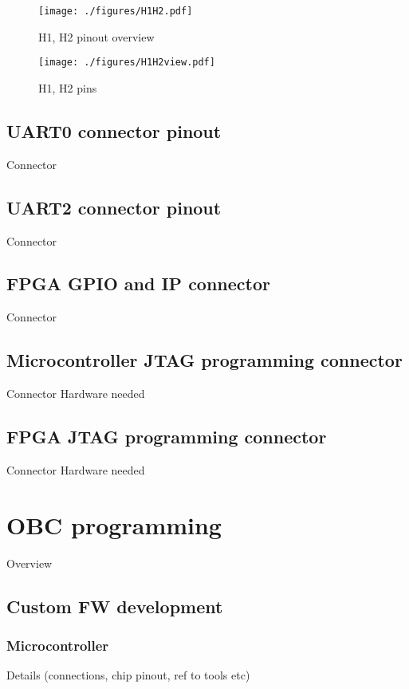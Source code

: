 \documentclass[12pt,a4paper]{report}
\begin{document}
\begin{figure}
\centering
\texttt{[image: ./figures/H1H2.pdf]}
\caption{H1, H2 pinout overview}
\label{fig_H1H2}
\end{figure}

\begin{figure}
\centering
\texttt{[image: ./figures/H1H2view.pdf]}
\caption{H1, H2 pins}
\label{fig_H1H2view}
\end{figure}


\section{UART0 connector pinout}
Connector

\section{UART2 connector pinout}
Connector

\section{FPGA GPIO and IP connector}
Connector

\section{Microcontroller JTAG programming connector}
Connector
Hardware needed

\section{FPGA JTAG programming connector}
Connector
Hardware needed

\chapter{OBC programming}
Overview

\section{Custom FW development}
\subsection{Microcontroller}
Details (connections, chip pinout, ref to tools etc)
\end{document}
